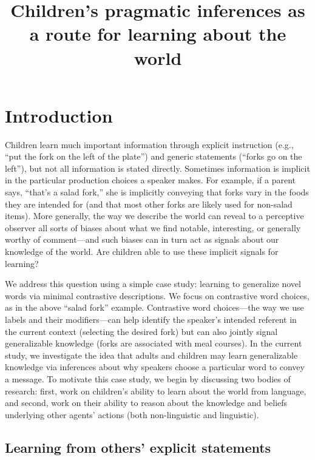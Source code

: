\documentclass[man]{apa2}
\title{
Children's pragmatic inferences as a route for learning about the world}
\begin{document}
\maketitle                            


\section{Introduction}

Children learn much important information through explicit instruction (e.g., ``put the fork on the left of the plate'') and generic statements (``forks go on the left''), but not all information is stated directly. Sometimes information is implicit in the particular production choices a speaker makes. For example, if a parent says, ``that's a salad fork,'' she is implicitly conveying that forks vary in the foods they are intended for (and that most other forks are likely used for non-salad items). More generally, the way we describe the world can reveal to a perceptive observer all sorts of biases about what we find notable, interesting, or generally worthy of comment---and such biases can in turn act as signals about our knowledge of the world. Are children able to use these implicit signals for learning? 

We address this question using a simple case study: learning to generalize novel words via minimal contrastive descriptions.  We focus on contrastive word choices, as in the above ``salad fork'' example. Contrastive word choices---the way we use labels and their modifiers---can help identify the speaker's intended referent in the current context (selecting the desired fork) but can also jointly signal generalizable knowledge (forks are associated with meal courses). In the current study, we investigate the idea that adults and children may learn generalizable knowledge via inferences about why speakers choose a particular word to convey a message. To motivate this case study, we begin by discussing two bodies of research: first, work on children's ability to learn about the world from language, and second, work on their ability to reason about the knowledge and beliefs underlying other agents' actions (both non-linguistic and linguistic). 


\subsection{Learning from others' explicit statements}
\end{document}
